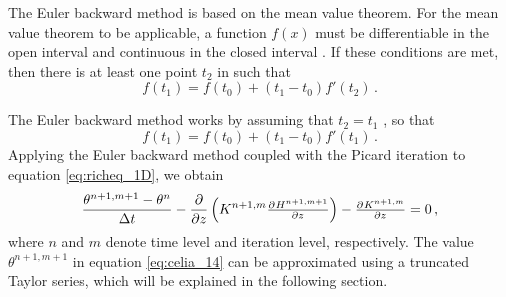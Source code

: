 The Euler backward method is based on the mean value theorem.  For the mean value theorem to be applicable, a function $f(x)$ must be differentiable in the open interval  and continuous in the closed interval  \parencite{Weisstein2017c}.  If these conditions are met, then there is at least one point $t_2$ in  such that
\begin{equation*}
  f(t_1) = f(t_0) + (t_1 - t_0) f'(t_2) \, .
\end{equation*}

The Euler backward method works by assuming that $t_2 = t_1$ \parencite{hairer_solving_2009}, so that
\begin{equation*}
  f(t_1) = f(t_0) + (t_1 - t_0) f'(t_1) \, .
\end{equation*}
Applying the Euler backward method coupled with the Picard iteration to equation \eqref{eq:richeq_1D}, we obtain \parencite{celia_general_1990}
\begin{equation}
  \label{eq:celia_14}
  \frac{\theta^{n+1,m+1} - \theta^n}{\Delta t} - \frac{\partial}{\partial z} \del{ K^{n+1,m}\pd{H^{n+1,m+1}}{z} } - \pd{K^{n+1,m}}{z} = 0 \, ,
\end{equation}
where $n$ and $m$ denote time level and iteration level, respectively.  The value $\theta^{n+1,m+1}$ in equation \eqref{eq:celia_14} can be approximated using a truncated Taylor series, which will be explained in the following section.


